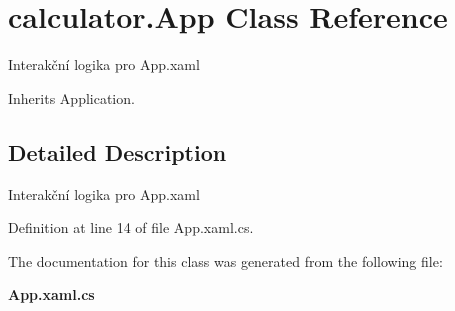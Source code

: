 \section{calculator.\+App Class Reference}
\label{classcalculator_1_1_app}


Interakční logika pro App.\+xaml  




Inherits Application.



\subsection{Detailed Description}
Interakční logika pro App.\+xaml 



Definition at line 14 of file App.\+xaml.\+cs.



The documentation for this class was generated from the following file\+:\begin{DoxyCompactItemize}
\item 
\textbf{ App.\+xaml.\+cs}\end{DoxyCompactItemize}
